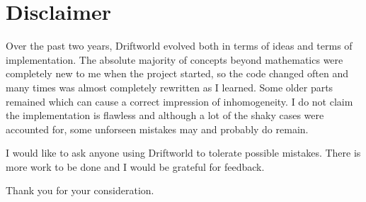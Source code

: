 \section*{Disclaimer}

Over the past two years, Driftworld evolved both in terms of ideas and terms of implementation. The absolute majority of concepts beyond mathematics were completely new to me when the project started, so the code changed often and many times was almost completely rewritten as I learned. Some older parts remained which can cause a correct impression of inhomogeneity. I do not claim the implementation is flawless and although a lot of the shaky cases were accounted for, some unforseen mistakes may and probably do remain.

I would like to ask anyone using Driftworld to tolerate possible mistakes. There is more work to be done and I would be grateful for feedback.

Thank you for your consideration.